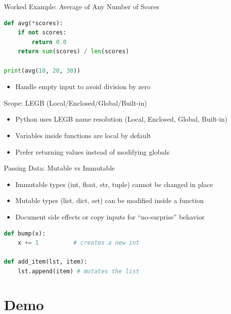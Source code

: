 \documentclass{beamer}
\begin{document}
\begin{frame}[fragile]{Worked Example: Average of Any Number of Scores}
  \begin{lstlisting}[language=Python]
def avg(*scores):
    if not scores:
        return 0.0
    return sum(scores) / len(scores)

print(avg(10, 20, 30))
  \end{lstlisting}
  \begin{itemize}[<+->]
    \item Handle empty input to avoid division by zero
  \end{itemize}
\end{frame}

\begin{frame}[fragile]{Scope: LEGB (Local/Enclosed/Global/Built-in)}
  \begin{itemize}[<+->]
    \item Python uses LEGB name resolution (Local, Enclosed, Global, Built-in)
    \item Variables inside functions are local by default
    \item Prefer returning values instead of modifying globals
  \end{itemize}
\end{frame}

\begin{frame}[fragile]{Passing Data: Mutable vs Immutable}
  \begin{itemize}[<+->]
    \item Immutable types (int, float, str, tuple) cannot be changed in place
    \item Mutable types (list, dict, set) can be modified inside a function
    \item Document side effects or copy inputs for ``no-surprise'' behavior
  \end{itemize}
  \vspace{0.3em}
  \begin{lstlisting}[language=Python]
def bump(x):
    x += 1          # creates a new int

def add_item(lst, item):
    lst.append(item) # mutates the list
  \end{lstlisting}
\end{frame}

\section{Demo}
\label{sec:demo}
\end{document}
